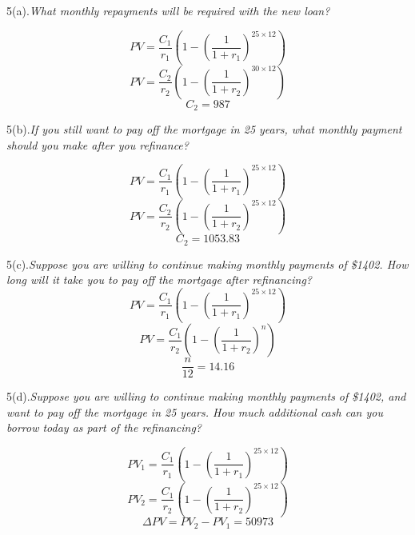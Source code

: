 \documentclass[10pt, a4paper]{article}
\begin{document}
5(a).\emph{What monthly repayments will be required with the new loan?}

$$PV = \frac{C_1}{r_1}(1 - (\frac{1}{1 + r_1})^{25 \times 12})$$
$$PV = \frac{C_2}{r_2}(1 - (\frac{1}{1 + r_2})^{30 \times 12})$$
$$C_2 = 987$$

5(b).\emph{If you still want to pay off the mortgage in 25 years, what monthly payment should you make after you refinance?}

$$PV = \frac{C_1}{r_1}(1 - (\frac{1}{1 + r_1})^{25 \times 12})$$
$$PV = \frac{C_2}{r_2}(1 - (\frac{1}{1 + r_2})^{25 \times 12})$$
$$C_2 = 1053.83$$

5(c).\emph{Suppose you are willing to continue making monthly payments of \$1402. How long will it take you to pay off the mortgage after refinancing?}
$$PV = \frac{C_1}{r_1}(1 - (\frac{1}{1 + r_1})^{25 \times 12})$$
$$PV = \frac{C_1}{r_2}(1 - (\frac{1}{1 + r_2})^{n})$$
$$\frac{n}{12} = 14.16$$

5(d).\emph{Suppose you are willing to continue making monthly payments of \$1402, and want to pay off the mortgage in 25 years. How much additional cash can you borrow today as part of the refinancing?}

$$PV_1 = \frac{C_1}{r_1}(1 - (\frac{1}{1 + r_1})^{25 \times 12})$$
$$PV_2 = \frac{C_1}{r_2}(1 - (\frac{1}{1 + r_2})^{25 \times 12})$$
$$\Delta PV = PV_2 - PV_1 = 50973$$
\end{document}

